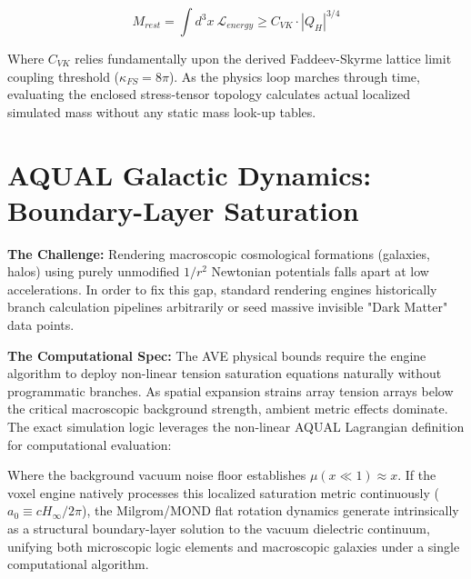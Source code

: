 \begin{equation}
    M_{rest} = \int d^3x \ \mathcal{L}_{energy} \geq C_{VK} \cdot |Q_H|^{3/4}
\end{equation}

Where $C_{VK}$ relies fundamentally upon the derived Faddeev-Skyrme lattice limit coupling threshold ($\kappa_{FS} = 8\pi$). As the physics loop marches through time, evaluating the enclosed stress-tensor topology calculates actual localized simulated mass without any static mass look-up tables.

\section{AQUAL Galactic Dynamics: Boundary-Layer Saturation}

\textbf{The Challenge:} Rendering macroscopic cosmological formations (galaxies, halos) using purely unmodified $1/r^2$ Newtonian potentials falls apart at low accelerations. In order to fix this gap, standard rendering engines historically branch calculation pipelines arbitrarily or seed massive invisible "Dark Matter" data points. 

\textbf{The Computational Spec:} The AVE physical bounds require the engine algorithm to deploy non-linear tension saturation equations naturally without programmatic branches. As spatial expansion strains array tension arrays below the critical macroscopic background strength, ambient metric effects dominate. The exact simulation logic leverages the non-linear AQUAL Lagrangian definition for computational evaluation:

Where the background vacuum noise floor establishes $\mu(x \ll 1) \approx x$. If the voxel engine natively processes this localized saturation metric continuously ($a_0 \equiv c H_\infty / 2\pi$), the Milgrom/MOND flat rotation dynamics generate intrinsically as a structural boundary-layer solution to the vacuum dielectric continuum, unifying both microscopic logic elements and macroscopic galaxies under a single computational algorithm.
